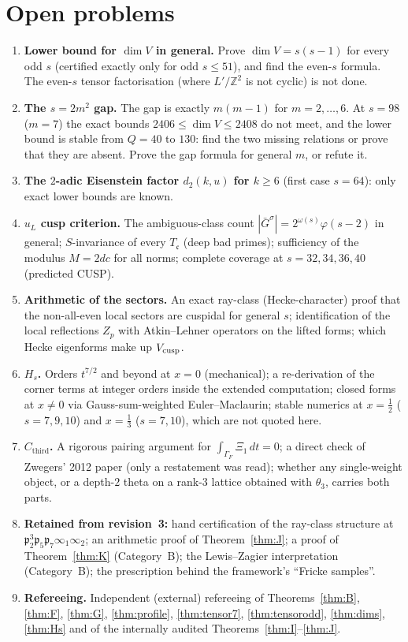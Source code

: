 \documentclass[11pt]{article}
\theoremstyle{definition}
\newcommand{\Z}{\mathbb{Z}}
\newcommand{\fp}{\mathfrak{p}}
\newcommand{\fc}{\mathfrak{c}}
\newcommand{\Cthird}{C_{\mathrm{third}}}
\begin{document}
\section{Open problems}\label{sec:open}
\begin{enumerate}[leftmargin=2em]
\item \textbf{Lower bound for $\dim V$ in general.} Prove $\dim V=s(s-1)$ for every odd $s$ (certified exactly only for odd $s\le51$), and find the even-$s$
formula. The even-$s$ tensor factorisation (where $L'/\Z^2$ is not cyclic) is not done.
\item \textbf{The $s=2m^2$ gap.} The gap is exactly $m(m-1)$ for $m=2,\dots,6$. At $s=98$ ($m=7$) the exact bounds $2406\le\dim V\le2408$ do not meet, and
the lower bound is stable from $Q=40$ to $130$: find the two missing relations or prove that they are absent. Prove the gap formula for general $m$, or
refute it.
\item \textbf{The $2$-adic Eisenstein factor $d_2(k,u)$ for $k\ge6$} (first case $s=64$): only exact lower bounds are known.
\item \textbf{$u_L$ cusp criterion.} The ambiguous-class count $|\bar G^\sigma|=2^{\omega(s)}\varphi(s-2)$ in general; $S$-invariance of every $T_\fc$ (deep
bad primes); sufficiency of the modulus $M=2dc$ for all norms; complete coverage at $s=32,34,36,40$ (predicted CUSP).
\item \textbf{Arithmetic of the sectors.} An exact ray-class (Hecke-character) proof that the non-all-even local sectors are cuspidal for general $s$;
identification of the local reflections $Z_p$ with Atkin--Lehner operators on the lifted forms; which Hecke eigenforms make up $V_{\rm cusp}$.
\item \textbf{$H_s$.} Orders $t^{7/2}$ and beyond at $x=0$ (mechanical); a re-derivation of the corner terms at integer orders inside the extended
computation; closed forms at $x\neq0$ via Gauss-sum-weighted Euler--Maclaurin; stable numerics at $x=\tfrac12$ ($s=7,9,10$) and $x=\tfrac13$ ($s=7,10$),
which are not quoted here.
\item \textbf{$\Cthird$.} A rigorous pairing argument for $\int_{\Gamma_F}\Xi_1\,dt=0$; a direct check of Zwegers' 2012 paper (only a restatement was
read); whether any single-weight object, or a depth-$2$ theta on a rank-$3$ lattice obtained with $\theta_3$, carries both parts.
\item \textbf{Retained from revision~3:} hand certification of the ray-class structure at $\fp_2^3\fp_5\fp_7\infty_1\infty_2$; an arithmetic proof of
Theorem~\ref{thm:J}; a proof of Theorem~\ref{thm:K} (Category~B); the Lewis--Zagier interpretation (Category~B); the prescription behind the framework's
``Fricke samples''.
\item \textbf{Refereeing.} Independent (external) refereeing of Theorems~\ref{thm:B}, \ref{thm:F}, \ref{thm:G}, \ref{thm:profile}, \ref{thm:tensor7},
\ref{thm:tensorodd}, \ref{thm:dims}, \ref{thm:Hs} and of the internally audited Theorems~\ref{thm:I}--\ref{thm:J}.
\end{enumerate}
\end{document}
